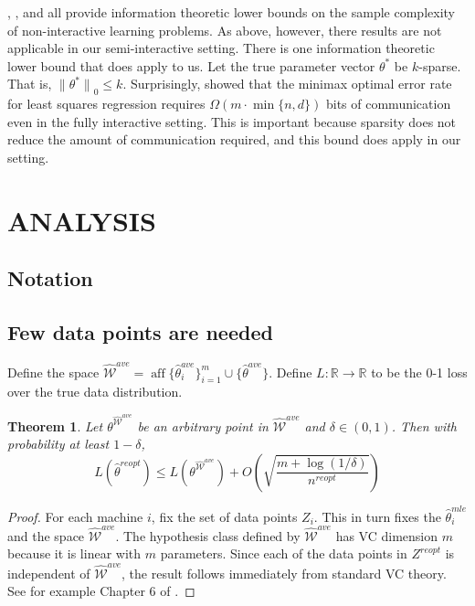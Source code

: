 \documentclass[twoside]{article}
\newtheorem{theorem}{Theorem}
\DeclareMathOperator*{\affspan}{aff}
\newcommand{\Wave}{{\mathcal{\hat W}^{ave}}}
\newcommand{\w}{\theta}
\newcommand{\wreopt}{\hat\w^{reopt}}
\newcommand{\wave}{\hat\w^{ave}}
\newcommand{\wmle}{\hat\w^{mle}}
\newcommand{\wstar}{{\w^{*}}}
\newcommand{\lzero}[1]{{\lVert {#1} \rVert}_0}
\newcommand{\fixme}[1]{\textbf{FIXME:} {#1}}
\begin{document}
\cite{shamir2014fundamental}, \cite{zhang2013information}, and \cite{garg2014communication} all provide information theoretic lower bounds on the sample complexity of non-interactive learning problems.
As above, however, there results are not applicable in our semi-interactive setting.
There is one information theoretic lower bound that does apply to us.
Let the true parameter vector $\wstar$ be $k$-sparse.
That is, $\lzero{\wstar} \le k$.
Surprisingly, \cite{braverman2015communication} showed that the minimax optimal error rate for least squares regression requires $\Omega(m\cdot\min\{n,d\})$ bits of communication even in the fully interactive setting.
This is important because sparsity does not reduce the amount of communication required, and this bound does apply in our setting.

\section{ANALYSIS}
\label{sec:anal}


\subsection{Notation}

\subsection{Few data points are needed}
\label{sec:vcdim}

Define the space
$\Wave=\affspan\{\wave_i\}_{i=1}^m\cup\{\wave\}$.
Define $L : \mathbb{R} \to \mathbb{R}$ to be the 0-1 loss over the true data distribution.

\begin{theorem}
Let $\w^\Wave$ be an arbitrary point in $\Wave$ and $\delta\in(0,1)$.
Then with probability at least $1-\delta$,
\begin{equation}
L(\wreopt) \le L(\w^\Wave) + O\left(\sqrt{\frac{m + \log(1/\delta)}{n^{reopt}}}\right)
\end{equation}
\end{theorem}
\begin{proof}
For each machine $i$, fix the set of data points $Z_i$.
This in turn fixes the $\wmle_i$ and the space $\Wave$.
The hypothesis class defined by $\Wave$ has VC dimension $m$ because it is linear with $m$ parameters.
Since each of the data points in $Z^{reopt}$ is independent of $\Wave$,
the result follows immediately from standard VC theory.
See for example Chapter 6 of \cite{shalev2014understanding}.
%
\end{proof}
\end{document}
